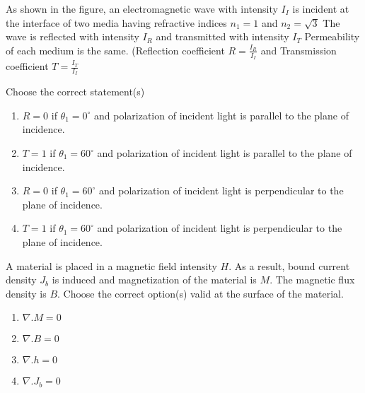     \item As shown in the figure, an electromagnetic wave with intensity $I_{I}$ is incident at the interface of two media having refractive indices $n_{1} = 1$ and $n_{2} = \sqrt{3}$ The wave is reflected with intensity $I_{R}$ and transmitted with intensity $I_{T}$ Permeability of each medium is the same. (Reflection coefficient $R = \frac{I_{R}}{I_{I}}$ and Transmission coefficient $T = \frac{I_{T}}{I_{I}} $
    \begin{figure}[H]
\centering
{}%

\label{fig:my_label}
\end{figure}
    Choose the correct statement(s)
    \begin{enumerate}
        \item $R = 0$ if $\theta_1 = 0^{\circ}$ and polarization of incident light is parallel to the plane of incidence.
         \item $T = 1$ if $\theta_1 = 60^{\circ}$ and polarization of incident light is parallel to the plane of incidence.
         \item $R = 0$ if $\theta_1 = 60^{\circ}$ and polarization of incident light is perpendicular to the plane of incidence.
          \item $T = 1$ if $\theta_1 = 60^{\circ}$ and polarization of incident light is perpendicular
          to the plane of incidence.
    \end{enumerate}

    \item A material is placed in a magnetic field intensity $H$. As a result, bound current density $J_{b}$ is induced and magnetization of the material is $M$. The magnetic flux density is $B$. Choose the correct option(s) valid at the surface of the material.
    \begin{enumerate}
        \item $\nabla . M = 0$
        \item $\nabla . B = 0$
        \item $\nabla . h = 0$
        \item $\nabla . J_b = 0$
    \end{enumerate}

